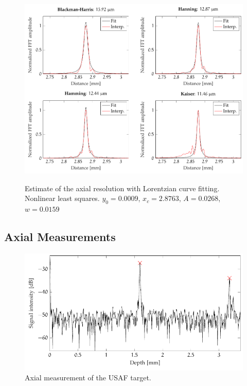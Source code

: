 \begin{figure}[hbt]
{\myfloatalign
\includegraphics[width=\linewidth]{gfx/tikz/axial_resolution}}
\caption{Estimate of the axial resolution with Lorentzian curve fitting. Nonlinear least squares. $y_0 = 0.0009$, $x_c=2.8763$, $A=0.0268$, $w=0.0159$}\label{fig:axial-resolution}
\end{figure}

\subsection{Axial Measurements}

\begin{figure}[hbt]
\myfloatalign
\includegraphics[width=\linewidth]{gfx/tikz/thickness-measure/target-thickness}
\caption{Axial measurement of the USAF target.}\label{fig:target-thickness}
\end{figure}

